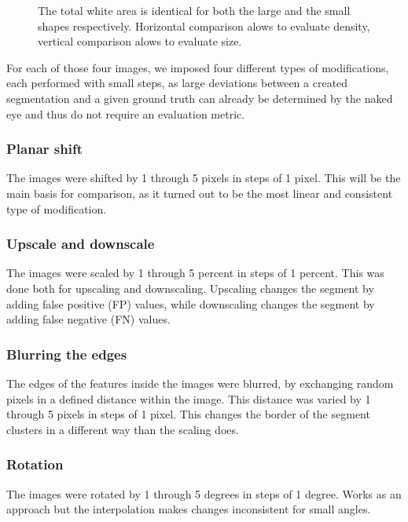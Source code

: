 \documentclass[journal]{IEEEtran}
\begin{document}
\begin{figure} [ht]
\begin{center}
		\caption{The total white area is identical for both the large and the small shapes respectively. Horizontal comparison alows to evaluate density, vertical comparison alows to evaluate size. }
		\label{fig:v}
		
	\end{center}
\end{figure}

\FloatBarrier

{\parindent0pt   %

For each of those four images, we imposed four different types of modifications, each performed with small steps, as large deviations between a created segmentation and a given ground truth can already be determined by the naked eye and thus do not require an evaluation metric.

\hspace{1in}

\subsubsection{Planar shift}
The images were shifted by 1 through 5 pixels in steps of 1 pixel. This will be the main basis for comparison, as it turned out to be the most linear and consistent type of modification.
	
\subsubsection{Upscale and downscale}
The images were scaled by 1 through 5 percent in steps of 1 percent. This was done both for upscaling and downscaling. Upscaling changes the segment by adding false positive (FP) values, while downscaling changes the segment by adding false negative (FN) values.

\subsubsection{Blurring the edges}
The edges of the features inside the images were blurred, by exchanging random pixels in a defined distance within the image. This distance was varied by 1 through 5 pixels in steps of 1 pixel. This changes the border of the segment clusters in a different way than the scaling does.

\subsubsection{Rotation}
The images were rotated by 1 through 5 degrees in steps of 1 degree. Works as an approach but the interpolation makes changes inconsistent for small angles.

} %
\end{document}
